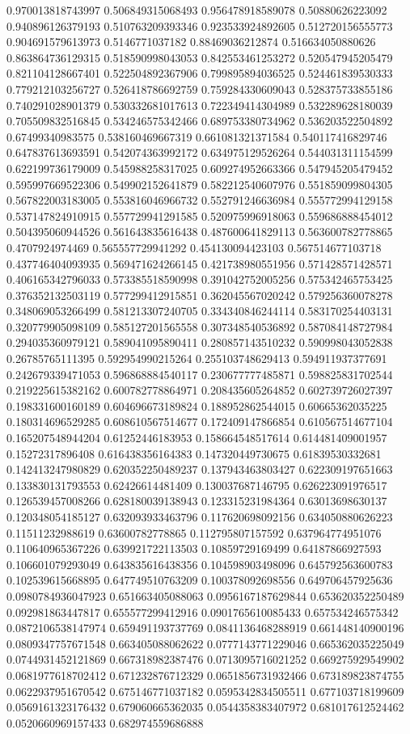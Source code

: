 \begin{table}
\begin{tabu}
\begin{sparkline}{10}
0.970013818743997 0.506849315068493 0.956478918589078 0.50880626223092 0.940896126379193 0.510763209393346 0.923533924892605 0.512720156555773 0.904691579613973 0.5146771037182 0.88469036212874 0.516634050880626 0.863864736129315 0.518590998043053 0.842553461253272 0.520547945205479 0.821104128667401 0.522504892367906 0.799895894036525 0.524461839530333 0.779212103256727 0.526418786692759 0.759284330609043 0.528375733855186 0.740291028901379 0.530332681017613 0.722349414304989 0.532289628180039 0.705509832516845 0.534246575342466 0.689753380734962 0.536203522504892 0.67499340983575 0.538160469667319 0.661081321371584 0.540117416829746 0.647837613693591 0.542074363992172 0.634975129526264 0.544031311154599 0.622199736179009 0.545988258317025 0.609274952663366 0.547945205479452 0.595997669522306 0.549902152641879 0.582212540607976 0.551859099804305 0.567822003183005 0.553816046966732 0.552791246636984 0.555772994129158 0.537147824910915 0.557729941291585 0.520975996918063 0.559686888454012 0.504395060944526 0.561643835616438 0.487600641829113 0.563600782778865 0.4707924974469 0.565557729941292 0.454130094423103 0.567514677103718 0.437746404093935 0.569471624266145 0.421738980551956 0.571428571428571 0.406165342796033 0.573385518590998 0.391042752005256 0.575342465753425 0.376352132503119 0.577299412915851 0.362045567020242 0.579256360078278 0.348069053266499 0.581213307240705 0.334340846244114 0.583170254403131 0.320779905098109 0.585127201565558 0.307348540536892 0.587084148727984 0.294035360979121 0.589041095890411 0.280857143510232 0.590998043052838 0.26785765111395 0.592954990215264 0.255103748629413 0.594911937377691 0.242679339471053 0.596868884540117 0.230677777485871 0.598825831702544 0.219225615382162 0.600782778864971 0.208435605264852 0.602739726027397 0.198331600160189 0.604696673189824 0.188952862544015 0.60665362035225 0.180314696529285 0.608610567514677 0.172409147866854 0.610567514677104 0.165207548944204 0.61252446183953 0.158664548517614 0.614481409001957 0.15272317896408 0.616438356164383 0.147320449730675 0.61839530332681 0.142413247980829 0.620352250489237 0.137943463803427 0.622309197651663 0.133830131793553 0.62426614481409 0.130037687146795 0.626223091976517 0.126539457008266 0.628180039138943 0.123315231984364 0.63013698630137 0.120348054185127 0.632093933463796 0.117620698092156 0.634050880626223 0.11511232988619 0.63600782778865 0.112795807157592 0.637964774951076 0.110640965367226 0.639921722113503 0.10859729169499 0.64187866927593 0.106601079293049 0.643835616438356 0.104598903498096 0.645792563600783 0.102539615668895 0.647749510763209 0.100378092698556 0.649706457925636 0.0980784936047923 0.651663405088063 0.0956167187629844 0.653620352250489 0.092981863447817 0.655577299412916 0.0901765610085433 0.657534246575342 0.0872106538147974 0.659491193737769 0.0841136468288919 0.661448140900196 0.0809347757671548 0.663405088062622 0.0777143771229046 0.665362035225049 0.0744931452121869 0.667318982387476 0.0713095716021252 0.669275929549902 0.0681977618702412 0.671232876712329 0.0651856731932466 0.673189823874755 0.0622937951670542 0.675146771037182 0.0595342834505511 0.677103718199609 0.0569161323176432 0.679060665362035 0.0544358383407972 0.681017612524462 0.0520660969157433 0.682974559686888 
\end{sparkline}
\end{tabu}
\end{table}
